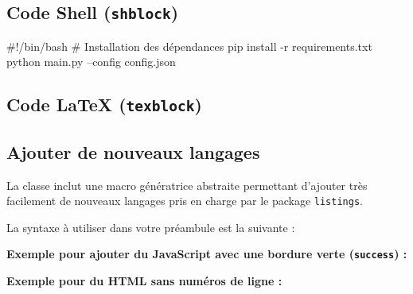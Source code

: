 \subsection{Code Shell (\texttt{shblock})}
\begin{shblock}
#!/bin/bash
# Installation des dépendances
pip install -r requirements.txt
python main.py --config config.json
\end{shblock}

\subsection{Code LaTeX (\texttt{texblock})}

\subsection{Ajouter de nouveaux langages}
La classe inclut une macro génératrice abstraite permettant d'ajouter très facilement de nouveaux langages pris en charge par le package \texttt{listings}. 

La syntaxe à utiliser dans votre préambule est la suivante :
\begin{texblock}
\end{texblock}

\textbf{Exemple pour ajouter du JavaScript avec une bordure verte (\texttt{success}) :}
\begin{texblock}
\end{texblock}

\textbf{Exemple pour du HTML sans numéros de ligne :}
\begin{texblock}
\end{texblock}


